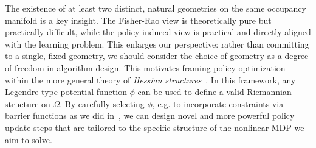 \documentclass{article}
\theoremstyle{plain}
\theoremstyle{definition}
\theoremstyle{remark}
\begin{document}
The existence of at least two distinct, natural geometries on the same occupancy manifold is a key insight. The Fisher-Rao view is theoretically pure but practically difficult, while the policy-induced view is practical and directly aligned with the learning problem. This enlarges our perspective: rather than committing to a single, fixed geometry, we should consider the choice of geometry as a degree of freedom in algorithm design.
This motivates framing policy optimization within the more general theory of \emph{Hessian structures}~\citep{shima2007geometry}. In this framework, any Legendre-type potential function $\phi$ can be used to define a valid Riemannian structure on $\Omega$. 
By carefully selecting $\phi$, e.g. to incorporate constraints via barrier functions as we did in~\citep{milosevic2024embedding}, we can design novel and more powerful policy update steps that are tailored to the specific structure of the nonlinear MDP we aim to solve.
\end{document}
